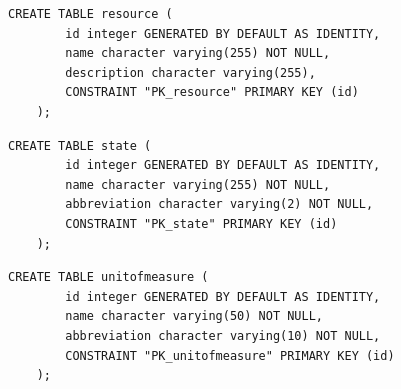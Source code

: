 \begin{quadro}[H]
	\caption[Script SQL --- Tabela \texttt{resource}]{Script SQL --- Tabela \texttt{resource}}
	\label{quadro:script-resource}
	
	\begin{minipage}{0.96\textwidth}
		\begin{lstlisting}[style=academic-sql]
	CREATE TABLE resource (
		id integer GENERATED BY DEFAULT AS IDENTITY,
		name character varying(255) NOT NULL,
		description character varying(255),
		CONSTRAINT "PK_resource" PRIMARY KEY (id)
	);
		\end{lstlisting}
	\end{minipage}
	
\end{quadro}

\begin{quadro}[H]
	\caption[Script SQL --- Tabela \texttt{state}]{Script SQL --- Tabela \texttt{state}}
	\label{quadro:script-state}
	
	\begin{minipage}{0.96\textwidth}
		\begin{lstlisting}[style=academic-sql]
	CREATE TABLE state (
		id integer GENERATED BY DEFAULT AS IDENTITY,
		name character varying(255) NOT NULL,
		abbreviation character varying(2) NOT NULL,
		CONSTRAINT "PK_state" PRIMARY KEY (id)
	);
		\end{lstlisting}
	\end{minipage}
	
\end{quadro}

\begin{quadro}[H]
	\caption[Script SQL --- Tabela \texttt{unitofmeasure}]{Script SQL --- Tabela \texttt{unitofmeasure}}
	\label{quadro:script-unitofmeasure}
	
	\begin{minipage}{0.96\textwidth}
		\begin{lstlisting}[style=academic-sql]
	CREATE TABLE unitofmeasure (
		id integer GENERATED BY DEFAULT AS IDENTITY,
		name character varying(50) NOT NULL,
		abbreviation character varying(10) NOT NULL,
		CONSTRAINT "PK_unitofmeasure" PRIMARY KEY (id)
	);
		\end{lstlisting}
	\end{minipage}
	
\end{quadro}

